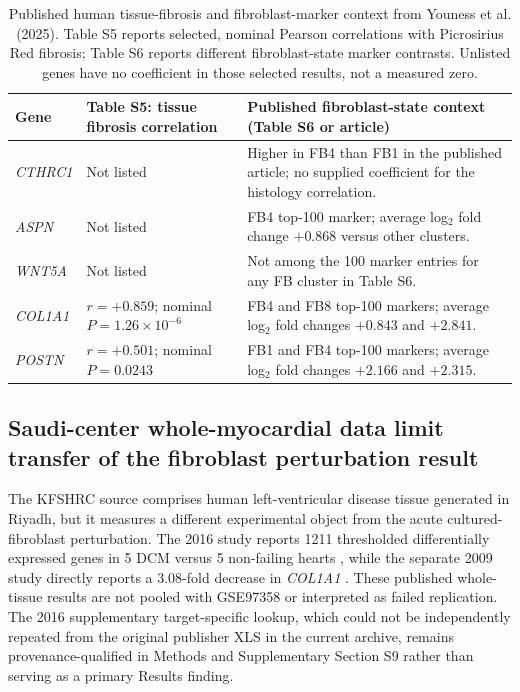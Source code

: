 \documentclass[preprint,11pt]{elsarticle}
\begin{document}
\begin{table}[!htbp]
\centering
\caption{Published human tissue-fibrosis and fibroblast-marker context from Youness et al. (2025). Table S5 reports selected, nominal Pearson correlations with Picrosirius Red fibrosis; Table S6 reports different fibroblast-state marker contrasts. Unlisted genes have no coefficient in those selected results, not a measured zero.}
\label{tab:histology}
\footnotesize
\begin{tabularx}{\linewidth}{p{1.65cm}p{3.20cm}Y}
\toprule
\textbf{Gene} & \textbf{Table S5: tissue fibrosis correlation} & \textbf{Published fibroblast-state context (Table S6 or article)}\\
\midrule
\textit{CTHRC1} & Not listed & Higher in FB4 than FB1 in the published article; no supplied coefficient for the histology correlation.\\
\textit{ASPN} & Not listed & FB4 top-100 marker; average log$_2$ fold change $+0.868$ versus other clusters.\\
\textit{WNT5A} & Not listed & Not among the 100 marker entries for any FB cluster in Table S6.\\
\textit{COL1A1} & $r=+0.859$; nominal $P=1.26\times10^{-6}$ & FB4 and FB8 top-100 markers; average log$_2$ fold changes $+0.843$ and $+2.841$.\\
\textit{POSTN} & $r=+0.501$; nominal $P=0.0243$ & FB1 and FB4 top-100 markers; average log$_2$ fold changes $+2.166$ and $+2.315$.\\
\bottomrule
\end{tabularx}
\end{table}

\subsection{Saudi-center whole-myocardial data limit transfer of the fibroblast perturbation result}
The KFSHRC source comprises human left-ventricular disease tissue generated in Riyadh, but it measures a different experimental object from the acute cultured-fibroblast perturbation. The 2016 study reports 1211 thresholded differentially expressed genes in 5 DCM versus 5 non-failing hearts \cite{Colak2016}, while the separate 2009 study directly reports a 3.08-fold decrease in \textit{COL1A1} \cite{Colak2009}. These published whole-tissue results are not pooled with GSE97358 or interpreted as failed replication. The 2016 supplementary target-specific lookup, which could not be independently repeated from the original publisher XLS in the current archive, remains provenance-qualified in Methods and Supplementary Section S9 rather than serving as a primary Results finding.
\end{document}
